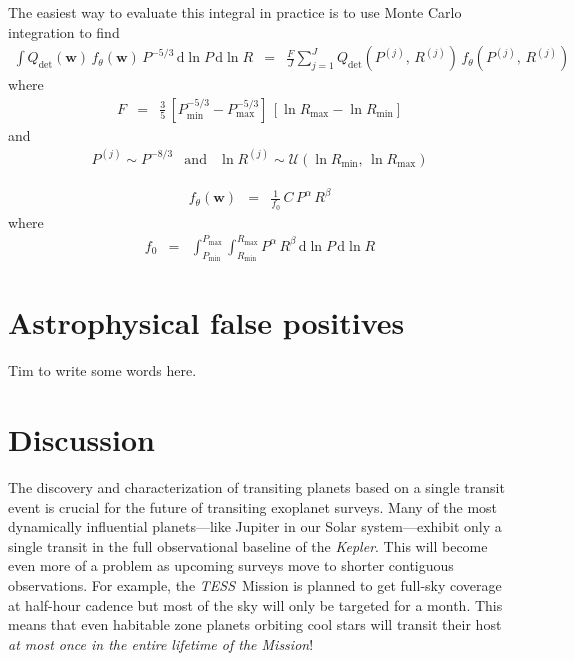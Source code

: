 \documentclass[twocolumn]{aastex6}
\newcommand{\project}[1]{\textsl{#1}}
\newcommand{\kepler}{\project{Kepler}}
\newcommand{\tess}{\project{TESS}}
\newcommand{\sectlabel}[1]{\label{sect:#1}}
\newcommand{\dd}{\ensuremath{\,\mathrm{d}}}
\newcommand{\bvec}[1]{{\ensuremath{\boldsymbol{#1}}}}
\newcommand{\params}{{\ensuremath{\bvec{w}}}}
\newcommand{\poppars}{{\ensuremath{\theta}}}
\begin{document}
The easiest way to evaluate this integral in practice is to use Monte Carlo
integration to find
\begin{eqnarray}
\int Q_{\mathrm{det}}(\params)\,f_\poppars(\params)\,P^{-5/3}\dd\ln P\dd\ln R
&=& \frac{F}{J}\sum_{j=1}^J Q_{\mathrm{det}}(P^{(j)},\,R^{(j)})\,
        f_\poppars(P^{(j)},\,R^{(j)})
\end{eqnarray}
where
\begin{eqnarray}
F &=& \frac{3}{5}\,[P_\mathrm{min}^{-5/3}-P_\mathrm{max}^{-5/3}]\,
      [\ln R_\mathrm{max} - \ln R_\mathrm{min}]
\end{eqnarray}
and
\begin{eqnarray}
P^{(j)} \sim P^{-8/3} &\mathrm{and}&
\ln R^{(j)} \sim \mathcal{U}(\ln R_\mathrm{min},\,\ln R_\mathrm{max})
\end{eqnarray}


\begin{eqnarray}
f_\poppars (\params) &=& \frac{1}{f_0}\,C\,P^\alpha\,R^\beta
\end{eqnarray}
where
\begin{eqnarray}
f_0 &=&
    \int_{P_\mathrm{min}}^{P_\mathrm{max}}
    \int_{R_\mathrm{min}}^{R_\mathrm{max}}
    P^\alpha\,R^\beta\dd\ln P\dd\ln R
\end{eqnarray}


\section{Astrophysical false positives}

Tim to write some words here.



\section{Discussion}\sectlabel{discussion}

The discovery and characterization of transiting planets based on a single
transit event is crucial for the future of transiting exoplanet surveys.
Many of the most dynamically influential planets---like Jupiter in our Solar
system---exhibit only a single transit in the full observational baseline of
the \kepler.
This will become even more of a problem as upcoming surveys move to shorter
contiguous observations.
For example, the \tess\ Mission is planned to get full-sky coverage at
half-hour cadence but most of the sky will only be targeted for a month.
This means that even habitable zone planets orbiting cool stars will transit
their host \emph{at most once in the entire lifetime of the Mission}!
\end{document}
